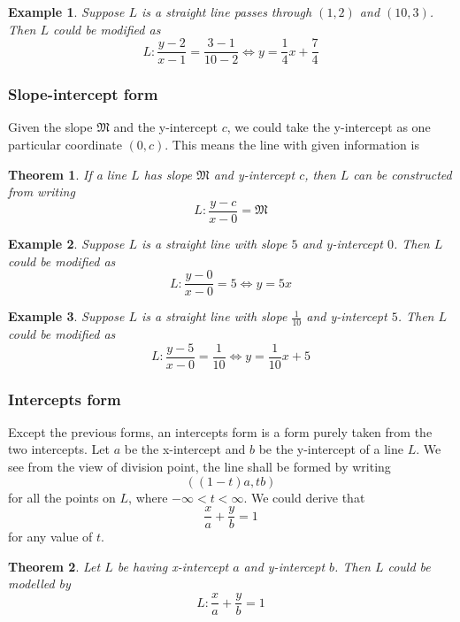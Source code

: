 \documentclass[12pt]{article}
\newtheorem*{theorem}{Theorem}
\newtheorem*{example}{Example}
\begin{document}
    \begin{example}
        Suppose $L$ is a straight line passes through $(1,2)$ and $(10,3)$. Then $L$ could be modified as $$L:\frac{y-2}{x-1}=\frac{3-1}{10-2}\iff y=\frac{1}{4}x+\frac{7}{4}$$
    \end{example}

    \subsubsection*{Slope-intercept form}

    Given the slope $\mathfrak{M}$ and the y-intercept $c$, we could take the y-intercept as one particular coordinate $(0,c)$. This means the line with given information is 

    \begin{theorem}
        If a line $L$ has slope $\mathfrak{M}$ and y-intercept $c$, then $L$ can be constructed from writing $$L:\frac{y-c}{x-0}=\mathfrak{M}$$
    \end{theorem}

    \begin{example}
        Suppose $L$ is a straight line with slope $5$ and y-intercept $0$. Then $L$ could be modified as $$L:\frac{y-0}{x-0}=5\iff y=5x$$
    \end{example}
    
    \begin{example}
        Suppose $L$ is a straight line with slope $\frac{1}{10}$ and y-intercept $5$. Then $L$ could be modified as $$L:\frac{y-5}{x-0}=\frac{1}{10}\iff y=\frac{1}{10}x+5$$
    \end{example}

    \subsubsection*{Intercepts form}

    Except the previous forms, an intercepts form is a form purely taken from the two intercepts. Let $a$ be the x-intercept and $b$ be the y-intercept of a line $L$. We see from the view of division point, the line shall be formed by writing $$((1-t)a, tb)$$ for all the points on $L$, where $-\infty<t<\infty$. We could derive that $$\frac{x}{a}+\frac{y}{b}=1$$ for any value of $t$.

    \begin{theorem}
        Let $L$ be having x-intercept $a$ and y-intercept $b$. Then $L$ could be modelled by $$L:\frac{x}{a}+\frac{y}{b}=1$$
    \end{theorem}
\end{document}
